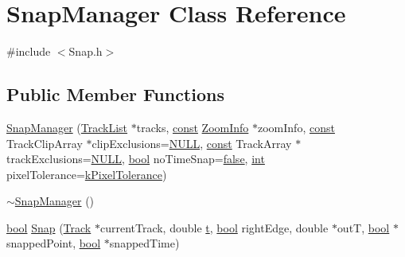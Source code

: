 \hypertarget{class_snap_manager}{}\section{Snap\+Manager Class Reference}
\label{class_snap_manager}


{\ttfamily \#include $<$Snap.\+h$>$}

\subsection*{Public Member Functions}
\begin{DoxyCompactItemize}
\item 
\hyperlink{class_snap_manager_ab92effb5d51a176f667c7f3827b00587}{Snap\+Manager} (\hyperlink{class_track_list}{Track\+List} $\ast$tracks, \hyperlink{getopt1_8c_a2c212835823e3c54a8ab6d95c652660e}{const} \hyperlink{class_zoom_info}{Zoom\+Info} $\ast$zoom\+Info, \hyperlink{getopt1_8c_a2c212835823e3c54a8ab6d95c652660e}{const} Track\+Clip\+Array $\ast$clip\+Exclusions=\hyperlink{px__mixer_8h_a070d2ce7b6bb7e5c05602aa8c308d0c4}{N\+U\+LL}, \hyperlink{getopt1_8c_a2c212835823e3c54a8ab6d95c652660e}{const} Track\+Array $\ast$track\+Exclusions=\hyperlink{px__mixer_8h_a070d2ce7b6bb7e5c05602aa8c308d0c4}{N\+U\+LL}, \hyperlink{mac_2config_2i386_2lib-src_2libsoxr_2soxr-config_8h_abb452686968e48b67397da5f97445f5b}{bool} no\+Time\+Snap=\hyperlink{mac_2config_2i386_2lib-src_2libsoxr_2soxr-config_8h_a65e9886d74aaee76545e83dd09011727}{false}, \hyperlink{xmltok_8h_a5a0d4a5641ce434f1d23533f2b2e6653}{int} pixel\+Tolerance=\hyperlink{_snap_8h_a2739774f5ae37c00849bce7da0aaa528}{k\+Pixel\+Tolerance})
\item 
\hyperlink{class_snap_manager_a036c49568031fed46767dd4232b1e4f1}{$\sim$\+Snap\+Manager} ()
\item 
\hyperlink{mac_2config_2i386_2lib-src_2libsoxr_2soxr-config_8h_abb452686968e48b67397da5f97445f5b}{bool} \hyperlink{class_snap_manager_af00969f70773cf5d532c670916e85269}{Snap} (\hyperlink{class_track}{Track} $\ast$current\+Track, double \hyperlink{octave__test_8m_aaccc9105df5383111407fd5b41255e23}{t}, \hyperlink{mac_2config_2i386_2lib-src_2libsoxr_2soxr-config_8h_abb452686968e48b67397da5f97445f5b}{bool} right\+Edge, double $\ast$outT, \hyperlink{mac_2config_2i386_2lib-src_2libsoxr_2soxr-config_8h_abb452686968e48b67397da5f97445f5b}{bool} $\ast$snapped\+Point, \hyperlink{mac_2config_2i386_2lib-src_2libsoxr_2soxr-config_8h_abb452686968e48b67397da5f97445f5b}{bool} $\ast$snapped\+Time)
\end{DoxyCompactItemize}
